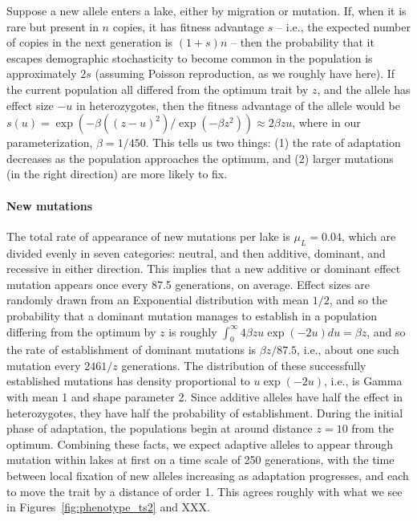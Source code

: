 \documentclass{article}
\newcommand{\plr}[1]{\todo[linecolor=blue,backgroundcolor=blue!25,bordercolor=blue]{#1}}
\begin{document}
Suppose a new allele enters a lake, either by migration or mutation. 
If, when it is rare but present in $n$ copies, it has fitness advantage $s$ 
-- i.e., the expected number of copies in the next generation is $(1+s)n$ 
-- then the probability that it escapes demographic stochasticity to become common in the population 
is approximately $2s$ \citep{lambert2006probability,haldane1927mathematical}
(assuming Poisson reproduction, as we roughly have here).
If the current population all differed from the optimum trait by $z$, 
and the allele has effect size $-u$ in heterozygotes, 
then the fitness advantage of the allele would be $s(u) = \exp(-\beta((z - u)^2) / \exp( - \beta z^2)) \approx 2 \beta z u$, where in our parameterization, $\beta = 1 / 450$. 
This tells us two things: (1) the rate of adaptation decreases as the population approaches the optimum, and (2) larger mutations (in the right direction) are more likely to fix.

\paragraph{New mutations}
The total rate of appearance of new mutations per lake is $\mu_L = 0.04$, 
which are divided evenly in seven categories: neutral, and then additive, dominant, and recessive in either direction. 
This implies that a new additive or dominant effect mutation appears once every 87.5 generations, on average. 
Effect sizes are randomly drawn from an Exponential distribution with mean $1/2$, 
and so the probability that a dominant mutation manages to establish in a population differing from the optimum by $z$ 
is roughly $\int_0^\infty 4 \beta z u \exp(-2u) du = \beta z$, 
and so the rate of establishment of dominant mutations is $\beta z / 87.5$, 
i.e., about one such mutation every $2461/z$ generations. 
The distribution of these successfully established mutations 
has density proportional to $u \exp(-2u)$, i.e., is Gamma with mean 1 and shape parameter 2. 
Since additive alleles have half the effect in heterozygotes, 
they have half the probability of establishment. 
During the initial phase of adaptation, the populations begin at around distance $z=10$ from the optimum. 
Combining these facts, we expect adaptive alleles to appear through mutation within lakes at first on a time scale of 250 generations, 
with the time between local fixation of new alleles increasing as adaptation progresses, and each to move the trait by a distance of order 1.
This agrees roughly with what we see in Figures~\ref{fig:phenotype_ts2} and XXX.
\plr{refer to additional trace plots in the supp}
\end{document}
